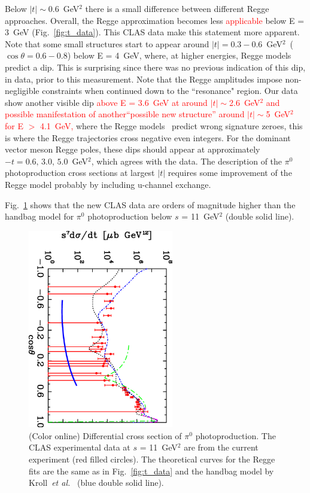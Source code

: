 \documentclass[aps,prc,twocolumn,floatfix,showpacs,preprintnumbers,amsmath,amssymb,superscriptaddress,linenumbers]{revtex4-1}
\begin{document}
Below $|t|\sim$0.6~GeV$^2$ there is a small difference between 
different Regge approaches.  Overall, the Regge approximation 
becomes less \textcolor{red}{applicable} below E = 3~GeV (Fig.~\ref{fig:t_data}).  
This CLAS data make this statement more apparent.  Note that 
some small structures start to appear around $|t| = 
0.3-0.6$~GeV$^2$~($\cos\theta = 0.6-0.8$) below E = 4~GeV, where, at higher energies, Regge models predict a dip.  
This is surprising since there was no previous 
indication of this dip, in data, prior to this measurement. 
Note that the Regge amplitudes impose non-negligible constraints when continued down to the 
``resonance" region.
Our data show another visible dip \textcolor{red}{above E = 3.6~GeV at around $|t|\sim$2.6~GeV$^2$ and possible manifestation of another``possible new structure'' around $|t|\sim$5~GeV$^2$ for E $>$ 4.1~GeV,} where the Regge models~\cite{Goldstein:1973xn,
Laget:2005be,Donnachie:2015jaa} predict wrong signature zeroes, 
this is where the Regge trajectories cross negative even integers. 
For the dominant vector meson Regge poles, these dips should appear 
at approximately $-t=0.6, \, 3.0, \, 5.0$~GeV$^2$,  which agrees 
with the data.  The description of the $\pi^0$ photoproduction 
cross sections at largest $|t|$ requires some improvement of the 
Regge model probably by including u-channel exchange.

Fig.~\ref{fig:kroll} shows that the new CLAS data are orders of 
magnitude higher than the handbag model for $\pi^0$ 
photoproduction below $s$ = 11~GeV$^2$ (double 
solid line).
\begin{figure}
\centerline{
        \includegraphics[width=2.5in, angle=90]{kroll.eps}}

        \caption {(Color online) Differential cross section 
	of $\pi^0$ photoproduction. The CLAS experimental data 
	at $s$ = 11~GeV$^2$ are from the current experiment (red 
	filled circles). The theoretical curves for the Regge 
	fits are the same as in Fig.~\protect\ref{fig:t_data} 
	and the handbag model by Kroll~\textit{et 
	al.}~\protect\cite{Huang:2000kd} (blue double solid 
	line).} \label{fig:kroll}
\end{figure}
\end{document}
